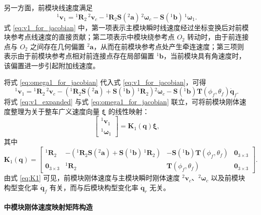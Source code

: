 另一方面，前模块线速度满足
\begin{equation}
{}^{1}\mathbf v_1
=
{}^{1}\mathbf R_2\,{}^{2}\mathbf v_c
-{}^{1}\mathbf R_2\mathbf S({}^{2}\mathbf a)\,{}^{2}\boldsymbol\omega_c
-\mathbf S({}^{1}\mathbf b)\,{}^{1}\boldsymbol\omega_1.
\label{eq:v1_for_jacobian}
\end{equation}
式 \eqref{eq:v1_for_jacobian} 中，第一项表示主模块瞬时线速度经过坐标变换后对前模块参考点线速度的直接贡献；第二项表示中模块绕参考点 $O_2$ 转动时，由于前连接点与 $O_2$ 之间存在几何偏置 ${}^{2}\mathbf a$，从而在前模块参考点处产生牵连速度；第三项则表示由于前模块参考点相对前连接点存在局部偏置 ${}^{1}\mathbf b$，当前模块具有角速度时，该偏置进一步引起附加线速度。

将式 \eqref{eq:omega1_for_jacobian} 代入式 \eqref{eq:v1_for_jacobian}，可得
\begin{equation}
{}^{1}\mathbf v_1
=
{}^{1}\mathbf R_2\,{}^{2}\mathbf v_c
-\left(
{}^{1}\mathbf R_2\mathbf S({}^{2}\mathbf a)+\mathbf S({}^{1}\mathbf b)\,{}^{1}\mathbf R_2
\right){}^{2}\boldsymbol\omega_c
-\mathbf S({}^{1}\mathbf b)\mathbf T(\phi_f,\theta_f)\dot{\mathbf q}_f.
\label{eq:v1_expanded}
\end{equation}
将式 \eqref{eq:v1_expanded} 与式 \eqref{eq:omega1_for_jacobian} 联立，可将前模块刚体速度整理为关于整车广义速度向量 $\boldsymbol\xi$ 的线性映射：
\begin{equation}
\begin{bmatrix}
{}^{1}\mathbf v_1\\
{}^{1}\boldsymbol\omega_1
\end{bmatrix}
=
\mathbf K_1(\mathbf q)\boldsymbol\xi,
\label{eq:K1_mapping}
\end{equation}
其中
\begin{equation}
\mathbf K_1(\mathbf q)=
\begin{bmatrix}
{}^{1}\mathbf R_2 &
-\left({}^{1}\mathbf R_2\mathbf S({}^{2}\mathbf a)+\mathbf S({}^{1}\mathbf b)\,{}^{1}\mathbf R_2\right) &
-\mathbf S({}^{1}\mathbf b)\mathbf T(\phi_f,\theta_f) &
\mathbf 0_{3\times 3}\\[4pt]
\mathbf 0_{3\times 3} &
{}^{1}\mathbf R_2 &
\mathbf T(\phi_f,\theta_f) &
\mathbf 0_{3\times 3}
\end{bmatrix}.
\label{eq:K1}
\end{equation}
由式 \eqref{eq:K1} 可见，前模块刚体速度与主模块瞬时刚体速度 ${}^{2}\mathbf v_c$、${}^{2}\boldsymbol\omega_c$ 以及前模块构型变化率 $\dot{\mathbf q}_f$ 有关，而与后模块构型变化率 $\dot{\mathbf q}_r$ 无关。

\paragraph{中模块刚体速度映射矩阵构造}

